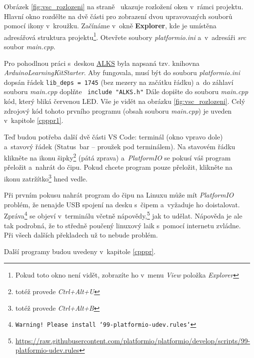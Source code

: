 \hypertarget{explorer}{}
Obrázek \ref{fig:vsc_rozlozeni} na straně~\pageref{fig:vsc_rozlozeni} ukazuje rozložení oken v~rámci projektu.
Hlavní okno  rozdělte na dvě části pro zobrazení dvou upravovaných souborů pomocí ikony v~kroužku.
Začínáme v~okně {\bf Explorer}, 
 kde je umístěna adresářová struktura projektu\footnote{Pokud toto okno není vidět, zobrazíte ho v~menu {\it View} položka {\it Explorer} }.
Otevřete soubory {\it platformio.ini} a~v~adresáři {\it src} soubor {\it main.cpp}. 
 
Pro pohodlnou práci s~deskou \hyperref[alks]{ALKS} byla napsaná tzv. knihovna {\it ArduinoLearningKitStarter}. 
Aby fungovala, musí být do souboru {\it platformio.ini} dopsán řádek {\tt lib\_deps = 1745} (bez mezery na začátku řádku) a~do záhlaví souboru {\it main.cpp} doplňte
\verb| include "ALKS.h"|
Dále dopište do souboru {\it main.cpp} kód, který bliká červenou LED.
Vše je vidět na obrázku \ref{fig:vsc_rozlozeni}.
Celý zdrojový kód tohoto prvního programu (obsah souboru {\it main.cpp}) je uveden v~kapitole \ref{cpppr1}.
 
Teď budou potřeba další dvě části VS Code: terminál  (okno vpravo dole) a~stavový řádek (Status~bar -- proužek pod terminálem). 
Na stavovém řádku klikněte na ikonu šipky\footnote{totéž provede {\it Ctrl+Alt+U}} (pátá zprava) a~{\it PlatformIO} se pokusí váš program přeložit a~nahrát do čipu. 
Pokud chcete program pouze přeložit, klikněte na ikonu zatržítko\footnote{totéž provede {\it Ctrl+Alt+B}} hned vedle. 

Při prvním pokusu nahrát program do čipu na Linuxu může mít {\it PlatformIO} problém, že nenajde USB spojení na desku s~čipem a~vyžaduje ho doistalovat. 
Zpráva\footnote{\tt Warning! Please install `99-platformio-udev.rules`} se objeví v~terminálu včetně nápovědy,\footnote{\url{https://raw.githubusercontent.com/platformio/platformio/develop/scripts/99-platformio-udev.rules}} jak to udělat.
Nápověda je ale tak podrobná, že to středně poučený linuxový laik s~pomocí internetu zvládne.
Při všech dalších překladech už to nebude problém.  

Další programy budou uvedeny v~kapitole \ref{cpppr}. 
